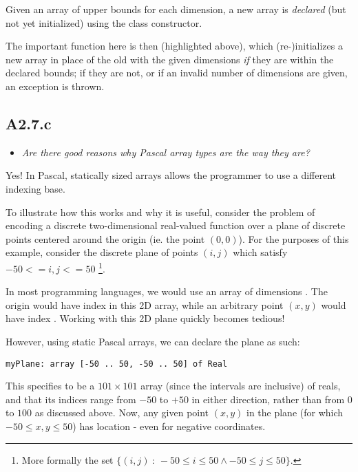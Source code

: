 Given an array of upper bounds for each dimension, a new array is
\emph{declared} (but not yet initialized) using the class constructor.

The important function here is then  (highlighted above),
which (re-)initializes a new array in place of the old with the given dimensions
\emph{if} they are within the declared bounds; if they are not, or if an invalid
number of dimensions are given, an exception is thrown.

\sectend

\subsection{A2.7.c}

\begin{itemize}
  \item \emph{Are there good reasons why Pascal array types are the way they
    are?}
\end{itemize}

Yes! In Pascal, statically sized arrays allows the programmer to use a different indexing base.

\medskip

To illustrate how this works and why it is useful, consider the problem of
encoding a discrete two-dimensional real-valued function over a plane of
discrete points centered around the origin (ie. the point $(0, 0)$). For the
purposes of this example, consider the discrete plane of points $(i, j)$ which
satisfy $-50 <= i, j <= 50$ \footnote{More formally the set $\{(i, j)\ :\ -50
\leq i \leq 50 \land -50 \leq j \leq 50\}$.}.

\smallskip

In most programming languages, we would use an array of dimensions
\ms{[101][101]}. The origin would have index \ms{[50][50]} in this 2D array,
while an arbitrary point $(x, y)$ would have index \ms{[x + 50][y + 50]}.
Working with this 2D plane quickly becomes tedious!

\medskip

However, using static Pascal arrays, we can declare the plane as such:

\begin{verbatim}
myPlane: array [-50 .. 50, -50 .. 50] of Real
\end{verbatim}

This specifies  to be a $101 \times 101$ array (since the intervals
are inclusive) of reals, and that its indices range from $-50$ to $+50$ in
either direction, rather than from $0$ to $100$ as discussed above. Now, any
given point $(x, y)$ in the plane (for which $-50 \leq x, y \leq 50$) has
location  - even for negative coordinates.

\Sectend
